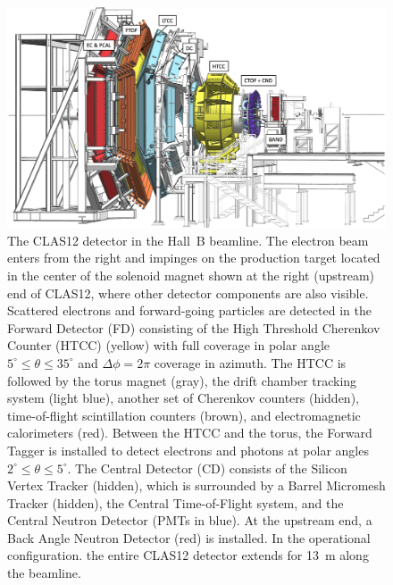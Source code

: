 \documentclass[final,3p]{elsarticle}
\begin{document}
\begin{twocolumn}
\begin{figure}[t]
\centering
\centerline{\includegraphics[width=1.8\columnwidth]{CLAS12-side.png}}
\caption{The CLAS12 detector in the Hall~B beamline. The electron beam enters from the right and impinges on
  the production target located in the center of the solenoid magnet shown at the right (upstream) end of CLAS12,
  where other detector components are also visible. Scattered electrons and forward-going particles are detected
  in the Forward Detector (FD) consisting of the High Threshold Cherenkov Counter (HTCC) (yellow) with full coverage
  in polar angle $5^\circ \le \theta \le 35^\circ$ and $\Delta \phi = 2\pi$ coverage in azimuth. The HTCC is followed
  by the torus magnet (gray), the drift chamber tracking system (light blue), another set of Cherenkov counters (hidden),
  time-of-flight scintillation counters (brown), and electromagnetic calorimeters (red). Between the HTCC and the
  torus, the Forward Tagger is installed to detect electrons and photons at polar angles $2^\circ \le \theta \le 5^\circ$.
  The Central Detector (CD) consists of the Silicon Vertex Tracker (hidden), which is surrounded by a Barrel Micromesh
  Tracker (hidden), the Central Time-of-Flight system, and the Central Neutron Detector (PMTs in blue). At the upstream
  end, a Back Angle Neutron Detector (red) is installed. In the operational configuration. the entire CLAS12 detector
  extends for 13~m along the beamline.} 
\label{clas12}
\end{figure}


\end{twocolumn}
\end{document}
